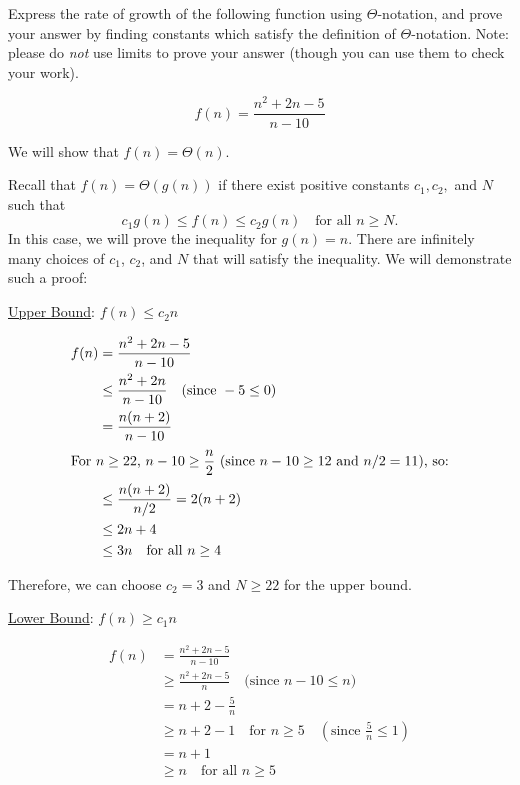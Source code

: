 \begin{prob}
    Express the rate of growth of the following function using $\Theta$-notation, and
    prove your answer by finding constants which satisfy the definition
    of $\Theta$-notation. Note: please do \emph{not} use limits to prove your answer (though
    you can use them to check your work).

    \[
        f(n) = \frac{n^2 + 2n - 5}{n - 10}
    \]
    
    \begin{soln}
        We will show that \( f(n) = \Theta(n) \).

        Recall that \( f(n) = \Theta(g(n)) \) if there exist positive constants \( c_1, c_2, \) and \( N \) such that
        \[
            c_1 g(n) \leq f(n) \leq c_2 g(n) \quad \text{for all } n \geq N.
        \]
        In this case, we will prove the inequality for $g(n) = n$. There are infinitely many choices of $c_1$, $c_2$, and $N$ that will satisfy the inequality. We will demonstrate such a proof:



        \underline{Upper Bound}: \( f(n) \leq c_2 n \)

        \begin{align*}
            f(n) &= \frac{n^2 + 2n - 5}{n - 10} \\
            &\leq \frac{n^2 + 2n}{n - 10} \quad \text{(since } -5 \leq 0) \\
            &= \frac{n(n + 2)}{n - 10} \\
            \intertext{For \( n \geq 22 \), \( n - 10 \geq \dfrac{n}{2} \) (since \( n - 10 \geq 12 \) and \( n/2 = 11 \)), so:}
            &\leq \frac{n(n + 2)}{n/2} = 2(n + 2) \\
            &\leq 2n + 4 \\
            &\leq 3n \quad \text{for all } n \geq 4
        \end{align*}

        Therefore, we can choose \( c_2 = 3 \) and \( N \geq 22 \) for the upper bound.

        \vspace{1em}
        \underline{Lower Bound}: \( f(n) \geq c_1 n \)

        \begin{align*}
            f(n) &= \frac{n^2 + 2n - 5}{n - 10} \\
            &\geq \frac{n^2 + 2n - 5}{n} \quad \text{(since } n - 10 \leq n) \\
            &= n + 2 - \frac{5}{n} \\
            &\geq n + 2 - 1 \quad \text{for } n \geq 5 \quad \left( \text{since } \frac{5}{n} \leq 1 \right) \\
            &= n + 1 \\
            &\geq n \quad \text{for all } n \geq 5
        \end{align*}


\end{soln}
\end{prob}
